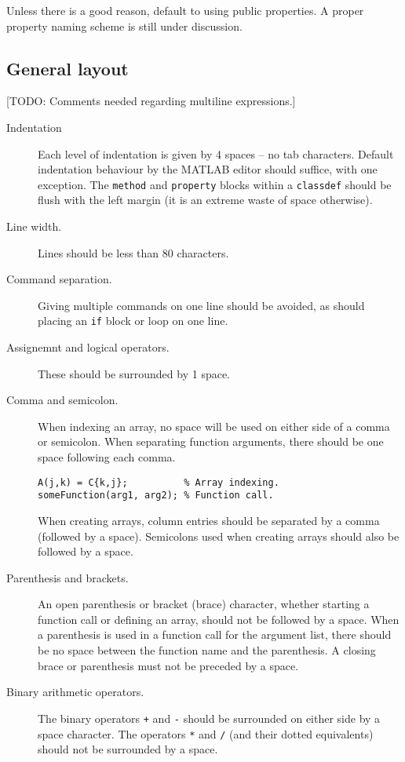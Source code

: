 \documentclass[12pt]{article}
\begin{document}
Unless there is a good reason, default to using public properties. A proper property naming scheme is still under discussion. %

\subsection{General layout}
[TODO: Comments needed regarding multiline expressions.]

\begin{description}
  \item[Indentation] Each level of indentation is given by 4 spaces -- no tab characters. Default indentation behaviour by the MATLAB editor should suffice, with one exception. The \verb|method| and \verb|property| blocks within a \verb|classdef| should be flush with the left margin (it is an extreme waste of space otherwise).
  \item[Line width.] Lines should be less than 80 characters.
  \item[Command separation.] Giving multiple commands on one line should be avoided, as should placing an \verb|if| block or loop on one line.
  \item[Assignemnt and logical operators.] These should be surrounded by 1 space.
  \item[Comma and semicolon.] When indexing an array, no space will be used on either side of a comma or semicolon. When separating function arguments, there should be one space following each comma.
    \begin{lstlisting}[frame=single]
A(j,k) = C{k,j};          % Array indexing.
someFunction(arg1, arg2); % Function call.
    \end{lstlisting}
    When creating arrays, column entries should be separated by a comma (followed by a space). Semicolons used when creating arrays should also be followed by a space.
  \item[Parenthesis and brackets.] An open parenthesis or bracket (brace) character, whether starting a function call or defining an array, should not be followed by a space. When a parenthesis is used in a function call for the argument list, there should be no space between the function name and the parenthesis. A closing brace or parenthesis must not be preceded by a space.
  \item[Binary arithmetic operators.] The binary operators \verb|+| and \verb|-| should be surrounded on either side by a space character. The operators \verb|*| and \verb|/| (and their dotted equivalents) should not be surrounded by a space.
\end{description}
\end{document}
